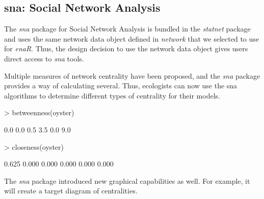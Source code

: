 \documentclass[11pt]{article}
\begin{document}
\subsection{sna: Social Network Analysis}
The \textit{sna} package for Social Network Analysis is bundled in the
\textit{statnet} package and uses the same network data object defined
in \textit{network} that we selected to use for \textit{enaR}.  Thus,
the design decision to use the network data object gives users direct
access to \textit{sna} tools.  

Multiple measures of network centrality have been proposed, and the
\textit{sna} package provides a way of calculating several.  Thus,
ecologists can now use the sna algorithms to determine different types
of centrality for their models.  

\begin{Schunk}
\begin{Sinput}
> betweenness(oyster)
\end{Sinput}
\begin{Soutput}
[1] 0.0 0.0 0.5 3.5 0.0 9.0
\end{Soutput}
\begin{Sinput}
> closeness(oyster)
\end{Sinput}
\begin{Soutput}
[1] 0.625 0.000 0.000 0.000 0.000 0.000
\end{Soutput}
\end{Schunk}

The \textit{sna} package introduced new graphical capabilities as
well. For example, it will create a target diagram of centralities.

\end{document}
